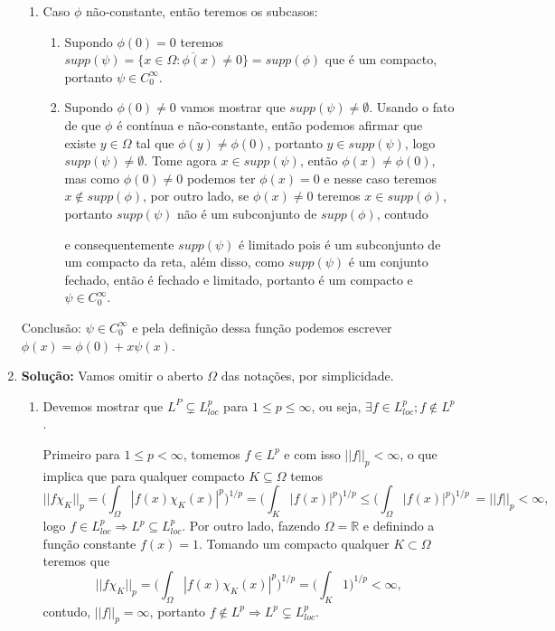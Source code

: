 \documentclass{article}
\begin{document}
\begin{enumerate}
\begin{enumerate}
			\item Caso $\phi$ não-constante, então teremos os subcasos:
				\begin{enumerate}
					\item Supondo $\phi(0) = 0$ teremos $supp(\psi) = \overline{ \{x \in \Omega: \phi(x) \neq 0\} } = supp(\phi)$ que é um compacto, portanto $\psi \in C^{\infty}_{0}$.
					
					\item Supondo $\phi(0) \neq 0$ vamos mostrar que $supp(\psi) \neq \emptyset$. Usando o fato de que $\phi$ é contínua e não-constante, então podemos afirmar que existe $y \in \Omega$ tal que $\phi(y) \neq \phi(0)$, portanto $y \in supp(\psi)$, logo $supp(\psi) \neq \emptyset$. Tome agora $x \in supp(\psi)$, então $\phi(x) \neq \phi(0)$, mas como $\phi(0) \neq 0$ podemos ter $\phi(x) = 0$ e nesse caso teremos $x \notin supp(\phi)$, por outro lado, se $\phi(x) \neq 0$ teremos $x \in supp(\phi)$, portanto $supp(\psi)$ não é um subconjunto de $supp(\phi)$, contudo 
					
					
					 e consequentemente $supp(\psi)$ é limitado pois é um subconjunto de um compacto da reta, além disso, como $supp(\psi)$ é um conjunto fechado, então é fechado e limitado, portanto é um compacto e $\psi \in C^{\infty}_{0}$.
				\end{enumerate}
		\end{enumerate}
		
		Conclusão: $\psi \in C^{\infty}_{0}$ e pela definição dessa função podemos escrever $\phi(x) = \phi(0) + x \psi(x)$.
		
		\item \textbf{Solução:} Vamos omitir o aberto $\Omega$ das notações, por simplicidade.
		\begin{enumerate}
			\item Devemos mostrar que $L^{P} \subsetneq L^{p}_{loc}$ para $1 \leq p \leq \infty$, ou seja, $\exists f \in L^{p}_{loc}; f \notin L^{p}$. 
			
			Primeiro para $1 \leq p < \infty$, tomemos $f \in L^{p}$ e com isso $||f||_{p} < \infty$, o que implica que para qualquer compacto $K \subseteq \Omega$ temos 
			$$
			||f\chi_{K}||_{p} = \Big( \int_{\Omega}|f(x)\chi_{K} (x)|^{p} \Big)^{1/p}= \Big( \int_{K}|f(x)|^{p} \Big)^{1/p} \leq \Big( \int_{\Omega}|f(x)|^{p} \Big)^{1/p} \ = ||f||_{p} < \infty,
			$$
			logo $f \in L^{p}_{loc} \Rightarrow L^{p} \subseteq L^{p}_{loc}$. Por outro lado, fazendo $\Omega = \mathbb{R}$ e definindo a função constante $f(x) = 1$. Tomando um compacto qualquer $K \subset \Omega$ teremos que 
			$$
			||f \chi_{K}||_{p} = \Big( \int_{\Omega} |f(x)\chi_{K}(x)|^{p} \Big)^{1/p} = \Big( \int_{K} 1 \Big)^{1/p} < \infty,
			$$
			contudo, 
			$||f||_{p} = \infty$, portanto $f \notin L^{p} \Rightarrow L^{p} \subsetneq L^{p}_{loc}$.
			

\end{enumerate}
\end{enumerate}
\end{document}
